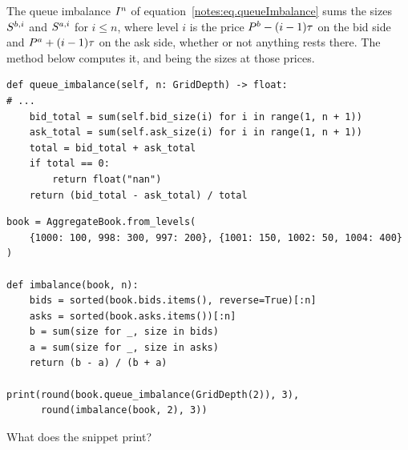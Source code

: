 \begin{question}
\label{question.imbalanceOverGridLevels}
The queue imbalance $\queueImbalance$ of equation~\eqref{notes:eq.queueImbalance} sums
the sizes $\nthBestBidSize[i]$ and $\nthBestAskSize[i]$ for $i \le n$,
where level $i$ is the price $\bestBidPrice - (i-1)\tickSizeOfLOB$ on the bid side
and $\bestAskPrice + (i-1)\tickSizeOfLOB$ on the ask side,
whether or not anything rests there.
The method below computes it,
 and  being the sizes at those prices.
\begin{lstlisting}[caption={\protect\codehl{unito26.lob.orderbook.AggregateBook.queue\_imbalance}, abridged.}, label=listing.imbalanceMethod]
def queue_imbalance(self, n: GridDepth) -> float:
# ...
    bid_total = sum(self.bid_size(i) for i in range(1, n + 1))
    ask_total = sum(self.ask_size(i) for i in range(1, n + 1))
    total = bid_total + ask_total
    if total == 0:
        return float("nan")
    return (bid_total - ask_total) / total
\end{lstlisting}
\begin{lstlisting}[caption={An imbalance over the first $n$ occupied levels, and the two compared}, label=listing.imbalanceOccupied]
book = AggregateBook.from_levels(
    {1000: 100, 998: 300, 997: 200}, {1001: 150, 1002: 50, 1004: 400}
)

def imbalance(book, n):
    bids = sorted(book.bids.items(), reverse=True)[:n]
    asks = sorted(book.asks.items())[:n]
    b = sum(size for _, size in bids)
    a = sum(size for _, size in asks)
    return (b - a) / (b + a)

print(round(book.queue_imbalance(GridDepth(2)), 3),
      round(imbalance(book, 2), 3))
\end{lstlisting}
What does the snippet print?
\begin{choices}
 \choice {}
 \choice {}
 \choice {}
 \correctchoice {}
\end{choices}
\end{question}

